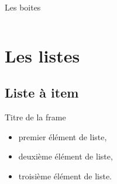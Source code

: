 \documentclass{bredelebeamer}
\begin{document}
    \begin{frame}{Les boites}

        \begin{columns}

            \begin{column}{0.5\textwidth}


            \end{column}

            \begin{column}{0.5\textwidth}



            \end{column}

        \end{columns}


    \end{frame}



    \section{Les listes}
    \subsection{Liste à item}

    \begin{frame}{Titre de la frame}

        \begin{itemize}
            \item premier élément de liste,
            \item deuxième élément de liste,
            \item troisième élément de liste.
        \end{itemize}
    \end{frame}
\end{document}
